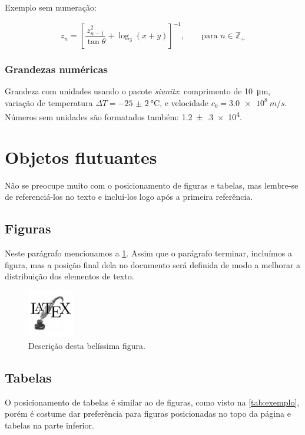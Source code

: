 \documentclass[brazilian, a4paper, 11pt]{article}
\begin{document}
Exemplo sem numeração:

\begin{equation*}
z_n = \left[\frac{z_{n-1}^2}{\tan\theta} + \log_3(x + y)\right]^{-1},\qquad\text{para } n \in \mathbb{Z}_+
\end{equation*}


\subsubsection{Grandezas numéricas}

Grandeza com unidades usando o pacote \emph{siunitx}: comprimento de \SI{10}{\micro m}, variação de temperatura $\Delta T = \SI{-25(2)}{\celsius}$, e velocidade $c_0 = \SI{3.0e8}{m/s}$.
Números sem unidades são formatados também: \num{1.2(3)e4}.


\section{Objetos flutuantes}

Não se preocupe muito com o posicionamento de figuras e tabelas, mas lembre-se de referenciá-los no texto e incluí-los logo após a primeira referência.


\subsection{Figuras}

Neste parágrafo mencionamos a \cref{fig:exemplo}.
Assim que o parágrafo terminar, incluímos a figura, mas a posição final dela no documento será definida de modo a melhorar a distribuição dos elementos de texto.

\begin{figure}[htpb]
\centering
\includegraphics[width=2cm]{exemplo}
\caption{Descrição desta belíssima figura.}
\label{fig:exemplo}
\end{figure}


\subsection{Tabelas}

O posicionamento de tabelas é similar ao de figuras, como visto na \cref{tab:exemplo}, porém é costume dar preferência para figuras posicionadas no topo da página e tabelas na parte inferior.
\end{document}
